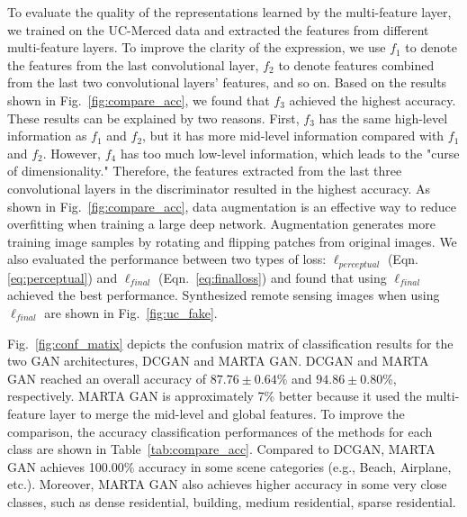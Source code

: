 \documentclass[journal]{IEEEtran}
\begin{document}
To evaluate the quality of the representations learned by the multi-feature layer, we trained on the UC-Merced data and extracted the features from different multi-feature layers.
To improve the clarity of the expression, we use $f_1$ to denote the features from the last convolutional layer, $f_2$ to denote features combined from the last two convolutional layers' features, and so on. Based on the results shown in Fig.~\ref{fig:compare_acc}, we found that $f_3$ achieved the highest accuracy. These results can be explained by two reasons. First, $f_3$ has the same high-level information as $f_1$ and $f_2$, but it has more mid-level information compared with $f_1$ and $f_2$. However, $f_4$ has too much low-level information, which leads to the "curse of dimensionality." Therefore, the features extracted from the last three convolutional layers in the discriminator resulted in the highest accuracy. As shown in Fig.~\ref{fig:compare_acc}, data augmentation is an effective way to reduce overfitting when training a large deep network. Augmentation generates more training image samples by rotating and flipping patches from original images. We also evaluated the performance between two types of loss: $\ell_{perceptual}$ (Eqn. \ref{eq:perceptual}) and $\ell_{final}$ (Eqn.~\ref{eq:finalloss}) and found that using $\ell_{final}$ achieved the best performance. Synthesized remote sensing images when using $\ell_{final}$ are shown in Fig.~\ref{fig:uc_fake}.









Fig.~\ref{fig:conf_matix} depicts the confusion matrix of classification results for the two GAN architectures, DCGAN and MARTA GAN. DCGAN and MARTA GAN reached an overall accuracy of $87.76\pm0.64$\% and $94.86\pm0.80$\%, respectively. MARTA GAN is approximately 7\% better because it used the multi-feature layer to merge the mid-level and global features. To improve the comparison, the accuracy classification performances of the methods for each class are shown in Table~\ref{tab:compare_acc}. Compared to DCGAN, MARTA GAN achieves 100.00\% accuracy in some scene categories (e.g., Beach, Airplane, etc.). Moreover, MARTA GAN also achieves higher accuracy in some very close classes, such as dense residential, building, medium residential, sparse residential.
\end{document}

